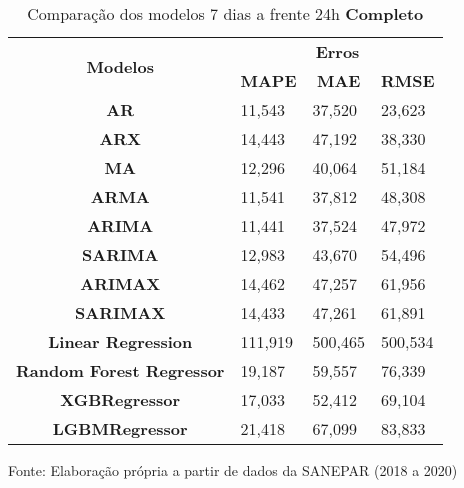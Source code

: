 \begin{table}[H]
	\centering
	\caption{Comparação dos modelos 7 dias a frente 24h \textbf{Completo} }\label{tb:10-24cm}
	\begin{tabular}{@{}clll@{}}
		\toprule
		\multirow{2}{*}{\textbf{Modelos}} & \multicolumn{3}{c}{\textbf{Erros}}                                                                       \\ \cmidrule(l){2-4} 
		& \multicolumn{1}{c}{\textbf{MAPE}} & \multicolumn{1}{c}{\textbf{MAE}} & \multicolumn{1}{c}{\textbf{RMSE}} \\ \hline
\textbf{AR}                       & 11,543                            & 37,520                           & 23,623                            \\
\textbf{ARX}                      & 14,443                            & 47,192                           & 38,330                            \\
\textbf{MA}                       & 12,296                            & 40,064                           & 51,184                            \\
\textbf{ARMA}                     & 11,541                            & 37,812                           & 48,308                            \\
\textbf{ARIMA}                    & 11,441                            & 37,524                           & 47,972                            \\
\textbf{SARIMA}                   & 12,983                            & 43,670                           & 54,496                            \\
\textbf{ARIMAX}                   & 14,462                            & 47,257                           & 61,956                            \\
\textbf{SARIMAX}                  & 14,433                            & 47,261                           & 61,891                            \\
\textbf{Linear Regression}        & 111,919                           & 500,465                          & 500,534                           \\
\textbf{Random Forest Regressor}  & 19,187                            & 59,557                           & 76,339                            \\
\textbf{XGBRegressor}             & 17,033                            & 52,412                           & 69,104                            \\
\textbf{LGBMRegressor}            & 21,418                            & 67,099                           & 83,833                            \\ \bottomrule
	\end{tabular}

Fonte: Elaboração própria a partir de dados da SANEPAR (2018 a 2020)
\end{table}


